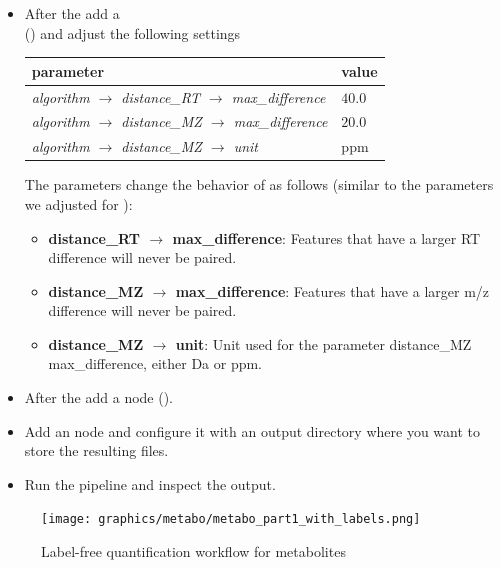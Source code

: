 \begin{itemize}
\item
After the  add a  \\
 () and adjust the following settings

\begin{center}
\begin{tabular}{l|l}
\textbf{parameter} & \textbf{value} \\ \hline
\textit{algorithm $\rightarrow$ distance\_RT $\rightarrow$ max\_difference} & $40.0$ \\
\textit{algorithm $\rightarrow$ distance\_MZ $\rightarrow$ max\_difference} & $20.0$ \\
\textit{algorithm $\rightarrow$ distance\_MZ $\rightarrow$ unit} & ppm
\end{tabular}
\end{center}

\noindent The parameters change the behavior of  as follows (similar to the parameters we adjusted for ):
\begin{itemize}
\item \textbf{distance\_RT $\rightarrow$ max\_difference}: Features that have a larger RT difference will never be paired.
\item \textbf{distance\_MZ $\rightarrow$ max\_difference}: Features that have a larger m/z difference will never be paired.
\item \textbf{distance\_MZ $\rightarrow$ unit}: Unit used for the parameter distance\_MZ max\_difference, either Da or ppm.
\end{itemize}

\item
After the  add a  node ().
\item
Add an  node and configure it with an output directory where you want to store the resulting files.
\item
Run the pipeline and inspect the output.
\end{itemize}

\begin{figure}[htbp]
  \centering
  \texttt{[image: graphics/metabo/metabo\_part1\_with\_labels.png]}
  \caption{Label-free quantification workflow for metabolites}
  \label{fig:metabo_part1}
\end{figure}

